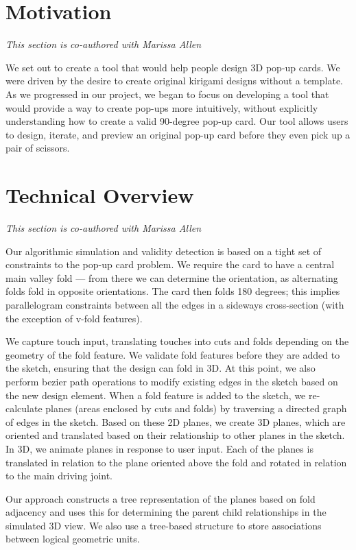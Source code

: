 \section{Motivation}\label{motivation}

\emph{This section is co-authored with Marissa Allen}

We set out to create a tool that would help people design 3D pop-up
cards. We were driven by the desire to create original kirigami designs
without a template. As we progressed in our project, we began to focus
on developing a tool that would provide a way to create pop-ups more
intuitively, without explicitly understanding how to create a valid
90-degree pop-up card. Our tool allows users to design, iterate, and
preview an original pop-up card before they even pick up a pair of
scissors.

\section{Technical Overview}\label{technical-overview}

\emph{This section is co-authored with Marissa Allen}

Our algorithmic simulation and validity detection is based on a tight
set of constraints to the pop-up card problem. We require the card to
have a central main valley fold --- from there we can determine the
orientation, as alternating folds fold in opposite orientations. The
card then folds 180 degrees; this implies parallelogram constraints
between all the edges in a sideways cross-section (with the exception of
v-fold features).

We capture touch input, translating touches into cuts and folds
depending on the geometry of the fold feature. We validate fold features
before they are added to the sketch, ensuring that the design can fold
in 3D. At this point, we also perform bezier path operations to modify
existing edges in the sketch based on the new design element. When a
fold feature is added to the sketch, we re-calculate planes (areas
enclosed by cuts and folds) by traversing a directed graph of edges in
the sketch. Based on these 2D planes, we create 3D planes, which are
oriented and translated based on their relationship to other planes in
the sketch. In 3D, we animate planes in response to user input. Each of
the planes is translated in relation to the plane oriented above the
fold and rotated in relation to the main driving joint.

Our approach constructs a tree representation of the planes based on
fold adjacency and uses this for determining the parent child
relationships in the simulated 3D view. We also use a tree-based
structure to store associations between logical geometric units.

